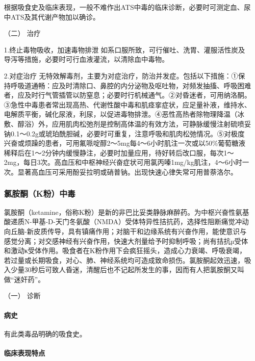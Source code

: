 根据吸食史及临床表现，一般不难作出ATS中毒的临床诊断，必要时可测定血、尿中ATS及其代谢产物加以确诊。

\hypertarget{text00131.htmlux5cux23CHP5-2-1-2-2}{}
（二） 治疗

1.终止毒物吸收，加速毒物排泄
如系口服所致，可行催吐、洗胃、灌服活性炭及导泻等措施，必要时可行血液灌流，以清除血中毒物。

2.对症治疗
无特效解毒剂，主要为对症治疗，防治并发症。包括以下措施：①保持呼吸道通畅：应及时清除口、鼻腔的内分泌物及呕吐物，对频发抽搐、呼吸困难者，应及时行气管插管以防窒息；必要时行机械通气。②对昏迷者，可用纳洛酮。③急性中毒患者常出现高热、代谢性酸中毒和肌痉挛症状，应足量补液，维持水、电解质平衡，碱化尿液，利尿，以促进毒物排泄。④恶性高热者除物理降温（冰敷、醇浴）外，应用肌肉松弛剂是控制高体温的有效方法，可静脉缓慢注射硫喷妥钠0.1～0.2g或琥珀酰胆碱，必要时可重复，注意呼吸和肌肉松弛情况。⑤对极度兴奋或烦躁的患者，可用氟哌啶醇2～5mg每4～6小时肌注一次或以50\%葡萄糖液稀释后在1～2分钟内缓慢静注，必要时加量应用，待好转后改口服，每次1～2mg，每日3次。高血压和中枢神经兴奋症状可用氯丙嗪1mg/kg肌注，4～6小时一次。显著高血压可采用酚妥拉明或硝普钠。出现快速心律失常可用普萘洛尔。

\subsubsection{氯胺酮（K粉）中毒}

氯胺酮（ketamine，俗称K粉）是新的非巴比妥类静脉麻醉药。为中枢兴奋性氨基酸递质N-甲基-D-天门冬氨酸（NMDA）受体特异性拮抗药，选择性阻断痛觉冲动向丘脑-新皮质传导，具有镇痛作用；对脑干和边缘系统有兴奋作用，能使意识与感觉分离；对交感神经有兴奋作用，快速大剂量给予时抑制呼吸；尚有拮抗µ受体和激动κ受体作用。吸食者在K粉作用下会疯狂摇头，造成心力衰竭、呼吸衰竭，若过量或长期吸食，对心、肺、神经系统均可造成致命损伤。氯胺酮起效迅速，吸入少量30秒后可致人昏迷，清醒后也不记起所发生的事，因而有人把氯胺酮又叫做“迷奸药”。

\hypertarget{text00131.htmlux5cux23CHP5-2-1-3-1}{}
（一） 诊断

\paragraph{病史}

有此类毒品明确的吸食史。

\paragraph{临床表现特点}

